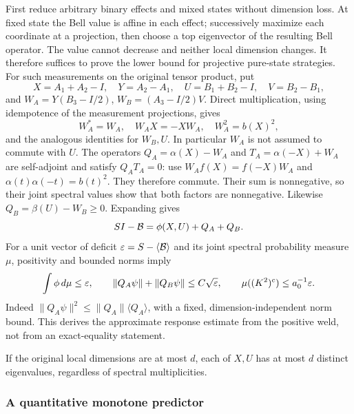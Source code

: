 First reduce arbitrary binary effects and mixed states without dimension
loss. At fixed state the Bell value is affine in each effect; successively
maximize each coordinate at a projection, then choose a top eigenvector
of the resulting Bell operator. The value cannot decrease and neither
local dimension changes. It therefore suffices to prove the lower bound
for projective pure-state strategies. For such measurements on the
original tensor product, put
\[
 X=A_1+A_2-I,\quad Y=A_2-A_1,\quad
 U=B_1+B_2-I,\quad V=B_2-B_1,
\]
and $W_A=Y(B_3-I/2)$, $W_B=(A_3-I/2)V$. Direct multiplication, using
idempotence of the measurement projections, gives
\[
 W_A^*=W_A,\quad W_AX=-XW_A,\quad W_A^2=b(X)^2,
\]
and the analogous identities for $W_B,U$. In particular $W_A$ is not
assumed to commute with $U$. The operators
$Q_A=\alpha(X)-W_A$ and $T_A=\alpha(-X)+W_A$ are self-adjoint and
satisfy $Q_AT_A=0$: use $W_Af(X)=f(-X)W_A$ and
$\alpha(t)\alpha(-t)=b(t)^2$. They therefore commute. Their sum is
nonnegative, so their joint spectral values show that both factors are
nonnegative. Likewise $Q_B=\beta(U)-W_B\ge0$. Expanding gives
\begin{equation}\label{eq:wf-weld}
 SI-\mathcal{B}=\phi(X,U)+Q_A+Q_B.
\end{equation}
For a unit vector of deficit $\varepsilon=S-\langle\mathcal{B}\rangle$ and its joint
spectral probability measure $\mu$, positivity and bounded norms imply
\begin{equation}\label{eq:wf-residual}
 \int\phi\,d\mu\le\varepsilon,\qquad
 \|Q_A\psi\|+\|Q_B\psi\|\le C\sqrt{\varepsilon},\qquad
 \mu((K^2)^c)\le a_0^{-1}\varepsilon.
\end{equation}
Indeed $\|Q_A\psi\|^2\le\|Q_A\|\langle Q_A\rangle$, with a fixed,
dimension-independent norm bound. This derives the approximate response
estimate from the positive weld, not from an exact-equality statement.

If the original local dimensions are at most $d$, each of $X,U$ has at most $d$ distinct
eigenvalues, regardless of spectral multiplicities.

\subsubsection*{A quantitative monotone predictor}

